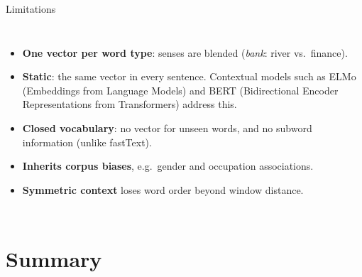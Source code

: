 \documentclass[aspectratio=169,11pt]{beamer}
\begin{document}
\begin{frame}{Limitations}
\begin{columns}[c]
\begin{itemize}\small
  \item \textbf{One vector per word type}: senses are blended (\emph{bank}: river vs.\ finance).
  \item \textbf{Static}: the same vector in every sentence. Contextual models such as ELMo (Embeddings from Language Models) and BERT (Bidirectional Encoder Representations from Transformers) address this.
  \item \textbf{Closed vocabulary}: no vector for unseen words, and no subword information (unlike fastText).
  \item \textbf{Inherits corpus biases}, e.g.\ gender and occupation associations.
  \item \textbf{Symmetric context} loses word order beyond window distance.
\end{itemize}
\centering
{}
\end{columns}
\end{frame}

\section{Summary}
\end{document}

